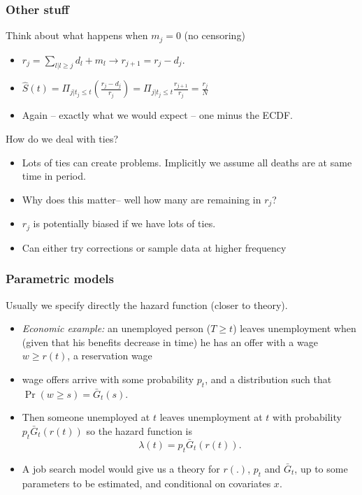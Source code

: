 \documentclass[xcolor=pdftex,dvipsnames,table,mathserif]{beamer}
\begin{document}
\begin{frame}
\frametitle{Other stuff}
Think about what happens when $m_j= 0$ (no censoring)
\begin{itemize}
\item $r_j=\sum_{l | l \geq j} d_l + m_l \rightarrow r_{j+1} = r_j - d_j$.
\item $ \hat{S}(t)= \Pi_{j|t_j \leq t} \left( \frac{r_j- d_j}{r_j} \right) =  \Pi_{j|t_j \leq t} \frac{r_{j+1}}{r_j} = \frac{r_j}{N}$
\item Again -- exactly what we would expect -- one minus the ECDF.
\end{itemize}
How do we deal with ties?
\begin{itemize}
\item Lots of ties can create problems. Implicitly we assume all deaths are at same time in period.
\item Why does this matter-- well how many are remaining in $r_j$?
\item $r_j$ is potentially biased if we have lots of ties.
\item Can either try corrections or sample data at higher frequency
\end{itemize}
\end{frame}




\begin{frame}
\frametitle{Parametric models}
 Usually we specify directly the hazard function (closer to theory).
\begin{itemize}
\item \emph{Economic example:\/} an unemployed person ($T \geq t$)  leaves unemployment
when (given that his benefits decrease in time) he has an offer with a wage $w \geq r(t)$, a reservation wage
\item wage offers arrive with some probability $p_t$, and a distribution such that
$\Pr(w\geq s)=\bar{G}_t(s)$.
\item Then someone unemployed at $t$ leaves unemployment at $t$   with probability 
$p_t \bar{G}_t(r(t))$
so the hazard function is 
\[ 
\lambda(t)=p_t\bar{G}_t(r(t)).
\]
\item A job search model would give us a theory for $r(.)$, $p_t$  and $\bar{G}_t$,
 up to some parameters to be estimated, and conditional on covariates $x$.
\end{itemize}
\end{frame}
\end{document}
